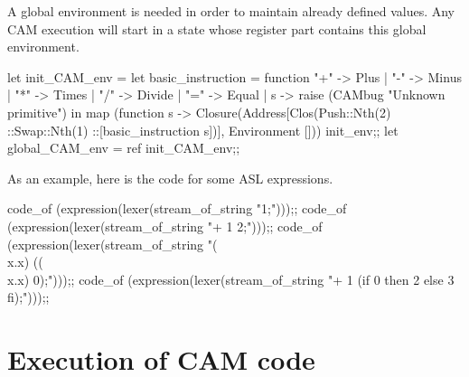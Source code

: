 A global environment is needed in order to maintain already defined
values. Any CAM execution will start in a state whose register part
contains this global environment.
%
\begin{caml_example}
let init_CAM_env =
  let basic_instruction = function
        "+" -> Plus
      | "-" -> Minus
      | "*" -> Times
      | "/" -> Divide
      | "=" -> Equal
      | s -> raise (CAMbug "Unknown primitive")
  in map (function s ->
           Closure(Address[Clos(Push::Nth(2)
                                 ::Swap::Nth(1)
                                 ::[basic_instruction s])],
                    Environment []))
         init_env;;
let global_CAM_env = ref init_CAM_env;;
\end{caml_example}

%
As an example, here is the code for some ASL expressions.
\begin{caml_example}
code_of (expression(lexer(stream_of_string "1;")));;
code_of (expression(lexer(stream_of_string "+ 1 2;")));;
code_of (expression(lexer(stream_of_string "(\\x.x) ((\\x.x) 0);")));;
code_of (expression(lexer(stream_of_string
                "+ 1 (if 0 then 2 else 3 fi);")));;
\end{caml_example}

\section{Execution of CAM code}
%

